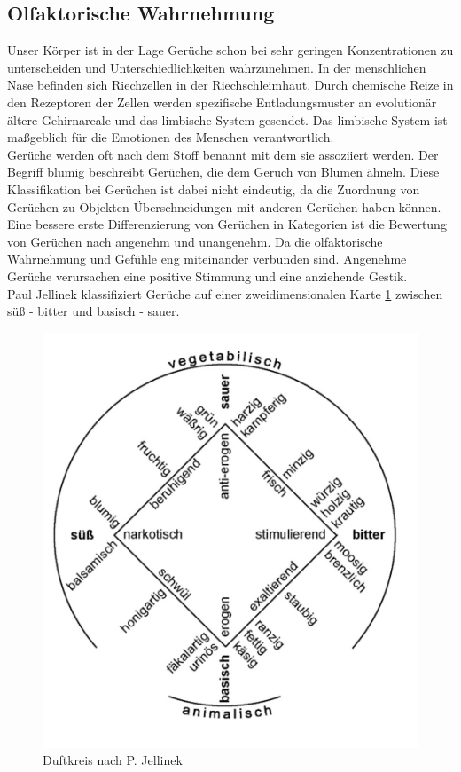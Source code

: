 \subsection{Olfaktorische Wahrnehmung}
Unser Körper ist in der Lage Gerüche schon bei sehr geringen Konzentrationen zu unterscheiden und Unterschiedlichkeiten wahrzunehmen. In der menschlichen Nase befinden sich Riechzellen in der Riechschleimhaut. Durch chemische Reize in den Rezeptoren der Zellen werden spezifische Entladungsmuster an evolutionär ältere Gehirnareale und das limbische System gesendet. Das limbische System ist maßgeblich für die Emotionen des Menschen verantwortlich. \cite[Vgl. Seite 102]{Schonhammer.2013}\\
Gerüche werden oft nach dem Stoff benannt mit dem sie assoziiert werden. Der Begriff \glqq blumig\grqq{} beschreibt Gerüchen, die dem Geruch von Blumen ähneln. \cite[Vgl. Seite 29 ff.]{Keller.2019}
Diese Klassifikation bei Gerüchen ist dabei nicht eindeutig, da die Zuordnung von Gerüchen zu Objekten Überschneidungen mit anderen Gerüchen haben können. Eine bessere erste Differenzierung von Gerüchen in Kategorien ist die Bewertung von Gerüchen nach angenehm und unangenehm. Da die olfaktorische Wahrnehmung und Gefühle eng miteinander verbunden sind. Angenehme Gerüche verursachen eine positive Stimmung und eine anziehende Gestik. \cite[Vgl. Seite 105 f.]{Schonhammer.2013}\\
Paul Jellinek klassifiziert Gerüche auf einer zweidimensionalen Karte \ref{fig:Duft} zwischen süß - bitter und basisch - sauer. \cite[Vgl. Seite 104]{Schonhammer.2013} \\
\begin{figure}[]
	\centering
	\includegraphics[width=0.5\linewidth]{images/Duft}
	\caption[Duftkreis nach P. Jellinek]{Duftkreis nach P. Jellinek \cite[Seite 105]{Schonhammer.2013}}
	\label{fig:Duft}
\end{figure}

